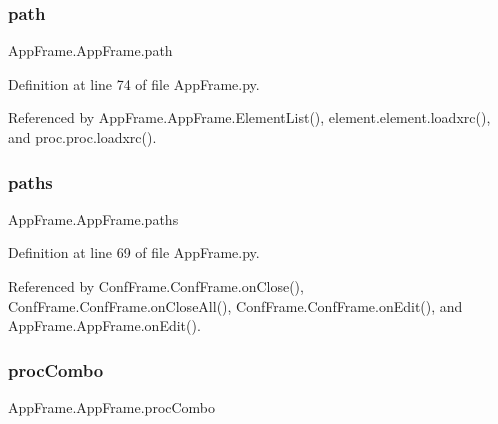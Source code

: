 \mbox{\label{classAppFrame_1_1AppFrame_a19baa2ed3517d6ac37fb071ee7f27c7d}} 
\subsubsection{\texorpdfstring{path}{path}}
{\footnotesize\ttfamily App\+Frame.\+App\+Frame.\+path}



Definition at line 74 of file App\+Frame.\+py.



Referenced by App\+Frame.\+App\+Frame.\+Element\+List(), element.\+element.\+loadxrc(), and proc.\+proc.\+loadxrc().

\mbox{\label{classAppFrame_1_1AppFrame_a0412b683dd3e2fad75d0ef570912857a}} 
\subsubsection{\texorpdfstring{paths}{paths}}
{\footnotesize\ttfamily App\+Frame.\+App\+Frame.\+paths}



Definition at line 69 of file App\+Frame.\+py.



Referenced by Conf\+Frame.\+Conf\+Frame.\+on\+Close(), Conf\+Frame.\+Conf\+Frame.\+on\+Close\+All(), Conf\+Frame.\+Conf\+Frame.\+on\+Edit(), and App\+Frame.\+App\+Frame.\+on\+Edit().

\mbox{\label{classAppFrame_1_1AppFrame_a28412078967d64f6acef6fd44b2273ec}} 
\subsubsection{\texorpdfstring{proc\+Combo}{procCombo}}
{\footnotesize\ttfamily App\+Frame.\+App\+Frame.\+proc\+Combo}



